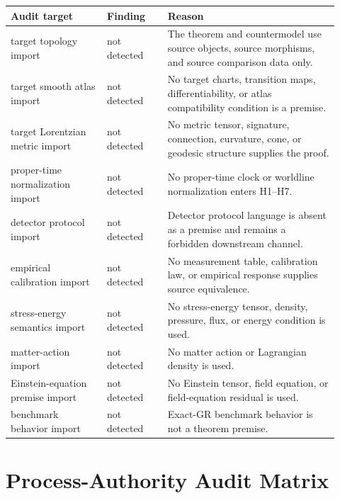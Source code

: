 \documentclass[11pt]{article}
\begin{document}
\begin{longtable}{p{0.27\linewidth}p{0.17\linewidth}p{0.48\linewidth}}
\toprule
Audit target & Finding & Reason \\
\midrule
target topology import & not detected & The theorem and countermodel use source objects, source morphisms, and source comparison data only. \\
target smooth atlas import & not detected & No target charts, transition maps, differentiability, or atlas compatibility condition is a premise. \\
target Lorentzian metric import & not detected & No metric tensor, signature, connection, curvature, cone, or geodesic structure supplies the proof. \\
proper-time normalization import & not detected & No proper-time clock or worldline normalization enters H1--H7. \\
detector protocol import & not detected & Detector protocol language is absent as a premise and remains a forbidden downstream channel. \\
empirical calibration import & not detected & No measurement table, calibration law, or empirical response supplies source equivalence. \\
stress-energy semantics import & not detected & No stress-energy tensor, density, pressure, flux, or energy condition is used. \\
matter-action import & not detected & No matter action or Lagrangian density is used. \\
Einstein-equation premise import & not detected & No Einstein tensor, field equation, or field-equation residual is used. \\
benchmark behavior import & not detected & Exact-GR benchmark behavior is not a theorem premise. \\
\bottomrule
\end{longtable}

\section{Process-Authority Audit Matrix}
\end{document}
